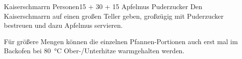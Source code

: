 \begin{MyRecipe}{Kaiserschmarrn}{ Personen}{\SI{15}{\minuteprime} + \SI{30}{\minuteprime} + \SI{15}{\minuteprime}}
	\ingredient[\Calc{0.2}{\x}]{\si{\kilogram}} {Apfelmus}
	 {Puderzucker}
	Den Kaiserschmarrn auf einen großen Teller geben, großzügig mit Puderzucker bestreuen und dazu Apfelmus servieren.\par\bigskip
	
	Für größere Mengen können die einzelnen Pfannen-Portionen auch erst mal im Backofen bei \SI{80}{\degreeCelsius} Ober-/Unterhitze warmgehalten werden.

	
	

	
	
	
	
\end{MyRecipe}